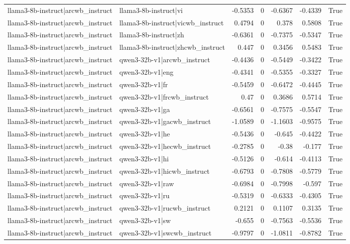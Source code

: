 \begin{table}
\begin{tabular}{l l r r r r l}
llama3-8b-instruct|arcwb_instruct & llama3-8b-instruct|vi & -0.5353 & 0 & -0.6367 & -0.4339 & True \\
llama3-8b-instruct|arcwb_instruct & llama3-8b-instruct|vicwb_instruct & 0.4794 & 0 & 0.378 & 0.5808 & True \\
llama3-8b-instruct|arcwb_instruct & llama3-8b-instruct|zh & -0.6361 & 0 & -0.7375 & -0.5347 & True \\
llama3-8b-instruct|arcwb_instruct & llama3-8b-instruct|zhcwb_instruct & 0.447 & 0 & 0.3456 & 0.5483 & True \\
llama3-8b-instruct|arcwb_instruct & qwen3-32b-v1|arcwb_instruct & -0.4436 & 0 & -0.5449 & -0.3422 & True \\
llama3-8b-instruct|arcwb_instruct & qwen3-32b-v1|eng & -0.4341 & 0 & -0.5355 & -0.3327 & True \\
llama3-8b-instruct|arcwb_instruct & qwen3-32b-v1|fr & -0.5459 & 0 & -0.6472 & -0.4445 & True \\
llama3-8b-instruct|arcwb_instruct & qwen3-32b-v1|frcwb_instruct & 0.47 & 0 & 0.3686 & 0.5714 & True \\
llama3-8b-instruct|arcwb_instruct & qwen3-32b-v1|ga & -0.6561 & 0 & -0.7575 & -0.5547 & True \\
llama3-8b-instruct|arcwb_instruct & qwen3-32b-v1|gacwb_instruct & -1.0589 & 0 & -1.1603 & -0.9575 & True \\
llama3-8b-instruct|arcwb_instruct & qwen3-32b-v1|he & -0.5436 & 0 & -0.645 & -0.4422 & True \\
llama3-8b-instruct|arcwb_instruct & qwen3-32b-v1|hecwb_instruct & -0.2785 & 0 & -0.38 & -0.177 & True \\
llama3-8b-instruct|arcwb_instruct & qwen3-32b-v1|hi & -0.5126 & 0 & -0.614 & -0.4113 & True \\
llama3-8b-instruct|arcwb_instruct & qwen3-32b-v1|hicwb_instruct & -0.6793 & 0 & -0.7808 & -0.5779 & True \\
llama3-8b-instruct|arcwb_instruct & qwen3-32b-v1|raw & -0.6984 & 0 & -0.7998 & -0.597 & True \\
llama3-8b-instruct|arcwb_instruct & qwen3-32b-v1|ru & -0.5319 & 0 & -0.6333 & -0.4305 & True \\
llama3-8b-instruct|arcwb_instruct & qwen3-32b-v1|rucwb_instruct & 0.2121 & 0 & 0.1107 & 0.3135 & True \\
llama3-8b-instruct|arcwb_instruct & qwen3-32b-v1|sw & -0.655 & 0 & -0.7563 & -0.5536 & True \\
llama3-8b-instruct|arcwb_instruct & qwen3-32b-v1|swcwb_instruct & -0.9797 & 0 & -1.0811 & -0.8782 & True \\

\end{tabular}
\end{table}
